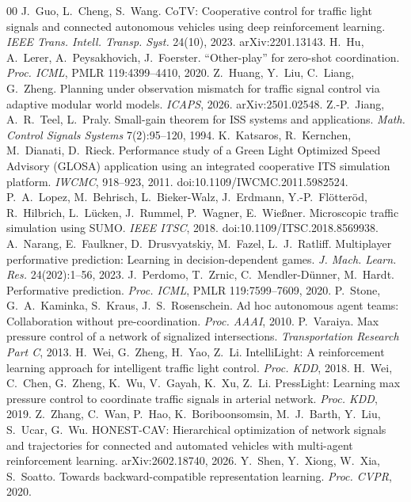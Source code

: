 \begin{thebibliography}{00}
 J.~Guo, L.~Cheng, S.~Wang. CoTV: Cooperative control for traffic light signals and connected autonomous vehicles using deep reinforcement learning. \emph{IEEE Trans. Intell. Transp. Syst.} 24(10), 2023. arXiv:2201.13143.
 H.~Hu, A.~Lerer, A.~Peysakhovich, J.~Foerster. ``Other-play'' for zero-shot coordination. \emph{Proc. ICML}, PMLR 119:4399--4410, 2020.
 Z.~Huang, Y.~Liu, C.~Liang, G.~Zheng. Planning under observation mismatch for traffic signal control via adaptive modular world models. \emph{ICAPS}, 2026. arXiv:2501.02548.
 Z.-P.~Jiang, A.~R.~Teel, L.~Praly. Small-gain theorem for ISS systems and applications. \emph{Math. Control Signals Systems} 7(2):95--120, 1994.
 K.~Katsaros, R.~Kernchen, M.~Dianati, D.~Rieck. Performance study of a Green Light Optimized Speed Advisory (GLOSA) application using an integrated cooperative ITS simulation platform. \emph{IWCMC}, 918--923, 2011. doi:10.1109/IWCMC.2011.5982524.
 P.~A.~Lopez, M.~Behrisch, L.~Bieker-Walz, J.~Erdmann, Y.-P.~Fl\"otter\"od, R.~Hilbrich, L.~L\"ucken, J.~Rummel, P.~Wagner, E.~Wie{\ss}ner. Microscopic traffic simulation using SUMO. \emph{IEEE ITSC}, 2018. doi:10.1109/ITSC.2018.8569938.
 A.~Narang, E.~Faulkner, D.~Drusvyatskiy, M.~Fazel, L.~J.~Ratliff. Multiplayer performative prediction: Learning in decision-dependent games. \emph{J. Mach. Learn. Res.} 24(202):1--56, 2023.
 J.~Perdomo, T.~Zrnic, C.~Mendler-D\"unner, M.~Hardt. Performative prediction. \emph{Proc. ICML}, PMLR 119:7599--7609, 2020.
 P.~Stone, G.~A.~Kaminka, S.~Kraus, J.~S.~Rosenschein. Ad hoc autonomous agent teams: Collaboration without pre-coordination. \emph{Proc. AAAI}, 2010.
 P.~Varaiya. Max pressure control of a network of signalized intersections. \emph{Transportation Research Part C}, 2013.
 H.~Wei, G.~Zheng, H.~Yao, Z.~Li. IntelliLight: A reinforcement learning approach for intelligent traffic light control. \emph{Proc. KDD}, 2018.
 H.~Wei, C.~Chen, G.~Zheng, K.~Wu, V.~Gayah, K.~Xu, Z.~Li. PressLight: Learning max pressure control to coordinate traffic signals in arterial network. \emph{Proc. KDD}, 2019.
 Z.~Zhang, C.~Wan, P.~Hao, K.~Boriboonsomsin, M.~J.~Barth, Y.~Liu, S.~Ucar, G.~Wu. HONEST-CAV: Hierarchical optimization of network signals and trajectories for connected and automated vehicles with multi-agent reinforcement learning. arXiv:2602.18740, 2026.
 Y.~Shen, Y.~Xiong, W.~Xia, S.~Soatto. Towards backward-compatible representation learning. \emph{Proc. CVPR}, 2020.

\end{thebibliography}
